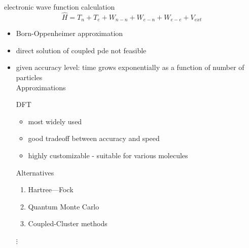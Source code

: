 \documentclass[slovene, usenames,dvipsnames]{beamer}
\begin{document}
  
  \begin{frame}{electronic wave function calculation}
    \begin{equation}\nonumber
      \hat H = T_n + T_e + W_{n-n} +  W_{e-n} + W_{e-e} +V_{ext}
    \end{equation}
    \begin{itemize}[]
    \item Born-Oppenheimer approximation
    \item direct solution of coupled pde not feasible
    \item given accuracy level: time grows exponentially as a function of number of particles
    \\
     \centering Approximations
    \\
    \begin{minipage}[t]{0.5\textwidth}

       \centering  DFT
      \begin{itemize}
      \item most widely used
      \item good tradeoff between accuracy and speed
       \item highly customizable - suitable for various molecules
      \end{itemize}      
    \end{minipage}%
    \begin{minipage}[t]{0.1\textwidth}
      \end{minipage}%
    \begin{minipage}[t]{0.4\textwidth}
       \centering  Alternatives
      \begin{enumerate}[$\ast$]
      \item Hartree---Fock
      \item Quantum Monte Carlo
      \item Coupled-Cluster methods
      \end{enumerate}
      \centering  $\vdots$
    \end{minipage}
    \end{itemize}
    
 
  \end{frame}
\end{document}
